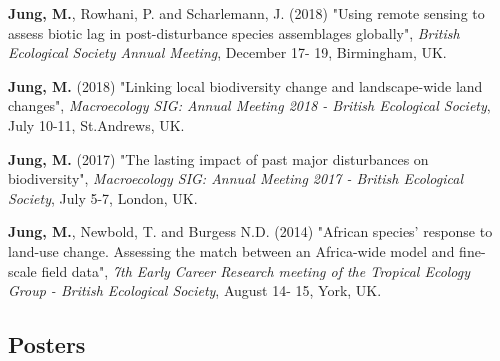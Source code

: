\documentclass[12pt,a4paper,serif]{moderncv}        %
\begin{document}
\begin{bibenum}

    \item \textbf{Jung, M.}, Rowhani, P. and Scharlemann, J. (2018) "Using remote sensing to assess biotic lag in post-disturbance species assemblages globally", \emph{British Ecological Society Annual Meeting}, December 17- 19, Birmingham, UK. 
    
    \item \textbf{Jung, M.} (2018) "Linking local biodiversity change and landscape-wide land changes", \emph{Macroecology SIG: Annual Meeting 2018 - British Ecological Society}, July 10-11, St.Andrews, UK.

    \item \textbf{Jung, M.} (2017) "The lasting impact of past major disturbances on biodiversity", \emph{Macroecology SIG: Annual Meeting 2017 - British Ecological Society}, July 5-7, London, UK.

    \item \textbf{Jung, M.}, Newbold, T. and Burgess N.D. (2014) "African species' response to land-use change. Assessing the match between an Africa-wide model and fine-scale field data", \emph{7th Early Career Research meeting of the Tropical Ecology Group - British Ecological Society}, August 14- 15, York, UK.

\end{bibenum}

\vspace{6pt}
\subsection{Posters}
\end{document}

